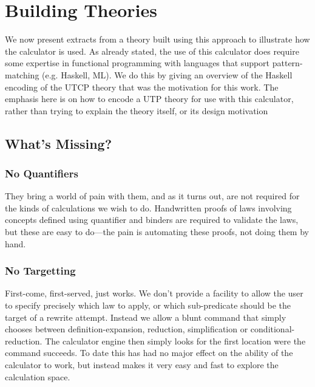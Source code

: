 \section{Building Theories}\label{sec:Theorising}


We now present extracts from a theory built using this
approach to illustrate how the calculator is used.
As already stated,
the use of this calculator does require some expertise
in functional programming with languages that support
pattern-matching (e.g. Haskell, ML).
We do this by giving an overview of the Haskell encoding
of the UTCP theory
that was the motivation for this work.
The emphasis here is on how to encode a UTP theory for use with this
calculator,
rather than trying to explain the theory itself, or its design motivation



\subsection{What's Missing?}

\subsubsection{No Quantifiers}\label{ssec:no-quant}

    They bring a world of pain with them,
    and as it turns out, are not required
    for the kinds of calculations we wish to do.
    Handwritten proofs of laws involving concepts
    defined using quantifier and binders
    are required to validate the laws,
    but these are easy to do---the pain is automating these proofs,
    not doing them by hand.

\subsubsection{No Targetting}\label{ssec:no-target}

First-come, first-served, just works.
We don't provide a facility
to allow the user to specify
precisely which law to apply,
or which sub-predicate should be the target of a rewrite attempt.
Instead we allow a blunt command that simply chooses between
definition-expansion, reduction, simplification or conditional-reduction.
The calculator engine then simply looks for the first location
were the command succeeds.
To date this has had no major effect on the ability of the calculator
to work, but instead makes it very easy and fast to explore the calculation space.
